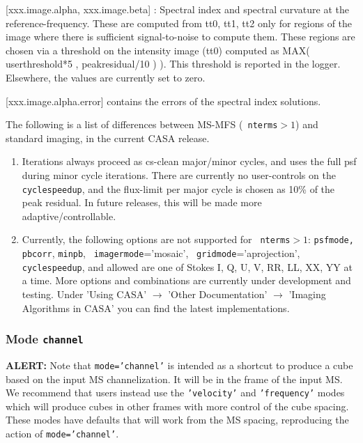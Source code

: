                [xxx.image.alpha, xxx.image.beta] : Spectral index and
               spectral curvature at the reference-frequency. These
               are computed from tt0, tt1, tt2 only for regions of the
               image where there is sufficient signal-to-noise to
               compute them. These regions are chosen via a threshold
               on the intensity image (tt0) computed as MAX(
               userthreshold*5 , peakresidual/10 ) ). This threshold
               is reported in the logger.  Elsewhere, the values are
               currently set to zero.

                [xxx.image.alpha.error] contains the errors of the
                spectral index solutions.


The following is a list of differences between MS-MFS ({\tt
                 nterms}$>1$) and standard imaging, in the current
               CASA release.

\begin{enumerate}


\item Iterations always proceed as cs-clean major/minor cycles, and
  uses the full psf during minor cycle iterations. There are currently
  no user-controls on the {\tt cyclespeedup}, and the flux-limit per major cycle is
  chosen as 10\% of the peak residual. In future releases, this will
  be made more adaptive/controllable.

\item Currently, the following options are not supported for {\tt
    nterms}$>1$: {\tt psfmode,} {\tt pbcorr}, {\tt minpb}, {\tt
    imagermode}='mosaic', {\tt
    gridmode}='aprojection', {\tt cyclespeedup}, and allowed are one
  of Stokes I, Q, U, V, RR, LL, XX, YY at a time. More options and combinations are currently under
  development and testing. Under 'Using CASA' $\rightarrow$ 'Other
  Documentation' $\rightarrow$ 'Imaging Algorithms in CASA' you can
  find the latest implementations. 

\end{enumerate}


\subsubsection{Mode {\tt channel} }
\label{section:im.pars.mode.channel}

{\bf ALERT:} Note that {\tt mode='channel'} is intended as a shortcut
to produce a cube based on the input MS channelization.  It will be in
the frame of the input MS.  We recommend that users instead use the
{\tt 'velocity'} and {\tt 'frequency'} modes which will produce cubes
in other frames with more control of the cube spacing.  These modes
have defaults that will work from the MS spacing, reproducing the
action of {\tt mode='channel'}.

